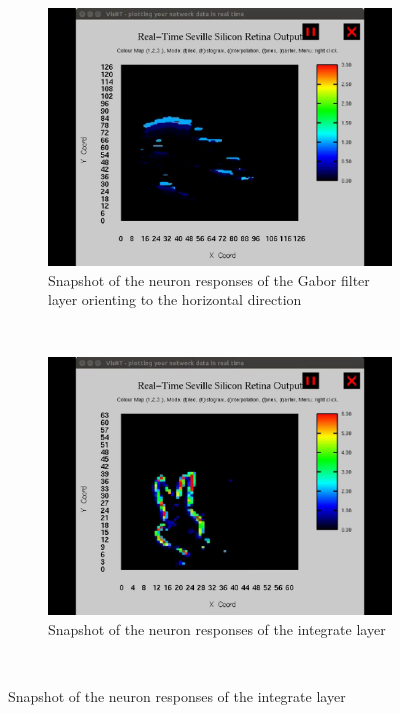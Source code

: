 \documentclass[journal]{journal}
\begin{document}
\begin{figure}
\centering
	\begin{subfigure}[t]{0.42\textwidth}
		\includegraphics[width=\textwidth]{pics/live1.png}
	    \caption{Snapshot of the neuron responses of the Gabor filter layer orienting to the horizontal direction }
	    \label{fig:live1}
	\end{subfigure}
	\\
	\begin{subfigure}[t]{0.42\textwidth}
		\includegraphics[width=\textwidth]{pics/live2.png}
		\caption{Snapshot of the neuron responses of the integrate layer}
	    \label{fig:live2}
	\end{subfigure}
	\\

\end{figure}
\end{document}
